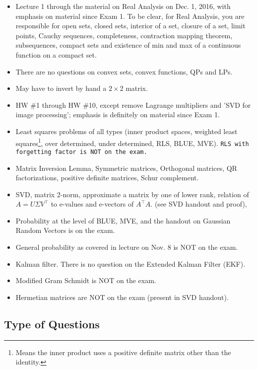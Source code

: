 \documentclass[letterpaper]{article}
\begin{document}
\begin{itemize}
\item Lecture 1 through the material on Real Analysis on Dec. 1, 2016, with emphasis on material since Exam 1. To be clear, for Real Analysis, you are responsible for open sets, closed sets, interior of a set, closure of a set, limit points, Cauchy sequences, completeness, contraction mapping theorem, subsequences, compact sets and existence of min and max of a continuous function on a compact set.
\item There are no questions on convex sets, convex functions, QPs and LPs.
\item May have to invert by hand a $2 \times 2$ matrix.
\item HW \#1 through HW \#10, except remove Lagrange multipliers and 'SVD for image processing'; emphasis is definitely on material since Exam 1.
\item Least squares problems of all types (inner product spaces, weighted least squares\footnote{Means the inner product uses a positive definite matrix other than the identity.}, over determined, under determined, RLS, BLUE, MVE). \texttt{RLS with forgetting factor is NOT on the exam.}
\item Matrix Inversion Lemma, Symmetric matrices, Orthogonal matrices,  QR factorizations, positive definite matrices, Schur complement.
\item SVD, matrix 2-norm, approximate a matrix by one of lower rank, relation of $A=U \Sigma V^\top$ to e-values and e-vectors of $A^\top A$. (see SVD handout and proof),
\item Probability at the level of BLUE, MVE, and the handout on Gaussian Random Vectors is on the exam.
\item General probability as covered in lecture on Nov. 8 is NOT on the exam.
\item Kalman filter. There is no question on the Extended Kalman Filter (EKF).
\item Modified Gram Schmidt is NOT on the exam.
\item Hermetian matrices are NOT on the exam (present in SVD handout).
\end{itemize}

\subsection*{Type of Questions}
\end{document}
